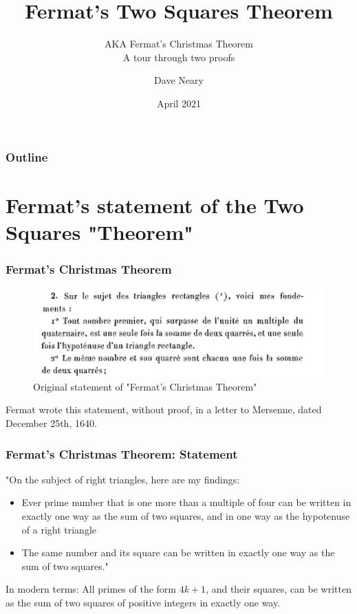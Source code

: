 \documentclass{beamer}
\title{Fermat's Two Squares Theorem}
\subtitle{AKA Fermat's Christmas Theorem\\A tour through two proofs}
\author{Dave Neary}
\date{April 2021}
\begin{document}
\frame{\titlepage}

\begin{frame}
	\frametitle{Outline}
	\tableofcontents
\end{frame}

\section{Fermat's statement of the Two Squares "Theorem"}

\begin{frame}
	\frametitle{Fermat's Christmas Theorem}
\begin{figure}
        \includegraphics[width=\linewidth]{extrait_letrre_du_25_decembre_1640.png}
        \caption*{Original statement of "Fermat's Christmas Theorem"}
        \label{fig:fermat1}
\end{figure}

	Fermat wrote this statement, without proof, in a letter to Mersenne, dated December
	25th, 1640.
\end{frame}

\begin{frame}
	\frametitle{Fermat's Christmas Theorem: Statement}
	
"On the subject of right triangles, here are my findings:
	\begin{itemize}
	\item Ever prime number that is one more than a multiple of four can be written in exactly
		one way as the sum of two squares, and in one way as the hypotenuse of a right triangle
	\item The same number and its square can be written in exactly one way as the sum of two squares."
	\end{itemize}

	In modern terms: All primes of the form $4k+1$, and their squares, can be written as the sum of two
	squares of positive integers in exactly one way.
\end{frame}
\end{document}
